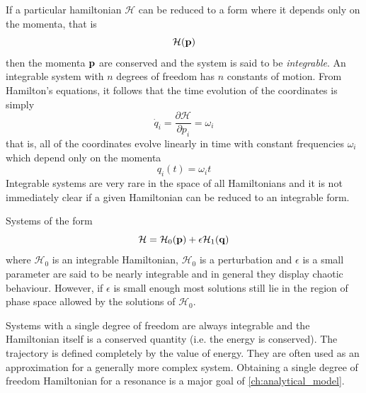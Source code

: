 \documentclass[ twoside,openright,titlepage,numbers=noenddot,headinclude,%
                footinclude=true,cleardoublepage=empty,abstractoff, %
                BCOR=5mm,paper=a4,fontsize=11pt,%
                american,%
                ]{scrreprt}
\begin{document}
If a particular hamiltonian $\mathcal{H}$ can be reduced to a form
where it depends only on the momenta, that is
\begin{equation}
    \mathcal{H}(\boldsymbol{\mathbf{p}})
\end{equation}
then the momenta $\boldsymbol{\mathbf{p}}$ are conserved and the system is said to be
\emph{integrable}. An integrable system with $n$ degrees of freedom
has $n$ constants of motion. From Hamilton's equations, it follows that the time
evolution of the coordinates is simply
\begin{equation}
    \dot{q}_i= \frac{\partial \mathcal{H}}{\partial p_i} =\omega_i
\end{equation}
that is, all of the coordinates evolve linearly in time with constant
frequencies $\omega_i$ which depend only on the momenta
\begin{equation}
q_i(t)=\omega_i t
\end{equation}
Integrable systems are very rare  in the space of all Hamiltonians and 
it is not immediately clear
if a given Hamiltonian can be reduced to an integrable form.

Systems of the form
\begin{equation}
    \mathcal{H}=\mathcal{H}_0(\boldsymbol{\mathbf{p}})+\epsilon \mathcal{H}_1(\boldsymbol{\mathbf{q}})
\end{equation}
where $\mathcal{H}_0$ is an integrable Hamiltonian, $\mathcal{H}_0$ is 
a perturbation and $\epsilon$ is a small parameter are said to be nearly 
integrable
and in general they display chaotic behaviour. However, if $\epsilon$ is 
small enough most solutions still lie in the region of phase space
allowed by the solutions of $\mathcal{H}_0$.

Systems with a single degree of freedom are always integrable and
the Hamiltonian itself is a conserved quantity (i.e. the energy
is conserved). The trajectory is defined completely by the value
of energy. They are often used as an approximation for a generally
more complex system. Obtaining a single degree of freedom
Hamiltonian for a resonance is a major goal of
\cref{ch:analytical_model}.
\end{document}

